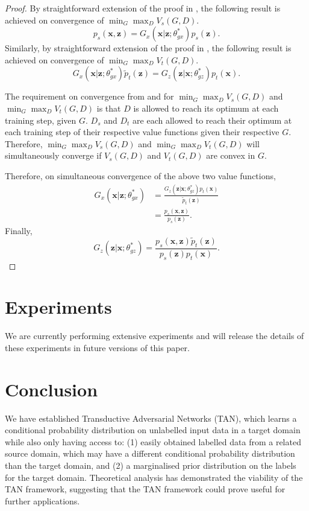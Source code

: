 \documentclass{article}
\begin{document}
\begin{proof}
By straightforward extension of the proof in \cite{goodfellow2014generative}, the following result is achieved on convergence of $\min_{G} \max_{D} V_s(G, D)$. 
\begin{equation}
p_s(\bm{x},\bm{z}) = G_x(\bm{x}|\bm{z};\theta_{gx}^*)p_s(\bm{z}).
\end{equation}
Similarly, by straightforward extension of the proof in \cite{dumoulin2016adversarially}, the following result is achieved on convergence of $\min_{G} \max_{D} V_t(G, D)$.
\begin{equation}
G_x(\bm{x}|\bm{z};\theta_{gx}^*)\widetilde{p}_t(\bm{z}) = G_z(\bm{z}|\bm{x}; \theta_{gz}^*)p_t(\bm{x}).
\end{equation}

The requirement on convergence from \cite{goodfellow2014generative} and \cite{dumoulin2016adversarially} for $\min_{G} \max_{D} V_s(G, D)$ and $\min_{G} \max_{D} V_t(G, D)$ is that $D$ is allowed to reach its optimum at each training step, given $G$. $D_s$ and $D_t$ are each allowed to reach their optimum at each training step of their respective value functions given their respective $G$. Therefore, $\min_{G} \max_{D} V_s(G, D)$ and $\min_{G} \max_{D} V_t(G, D)$ will simultaneously converge if $V_s(G, D)$ and $V_t(G, D)$ are convex in $G$.

Therefore, on simultaneous convergence of the above two value functions,
\begin{equation}
\begin{split}
G_x(\bm{x}|\bm{z};\theta_{gx}^*) &= \frac{G_z(\bm{z}|\bm{x}; \theta_{gz}^*)p_t(\bm{x})}{\widetilde{p}_t(\bm{z})}\\
&= \frac{p_s(\bm{x},\bm{z})}{p_s(\bm{z})}.
\end{split}
\end{equation}
Finally,
\begin{equation}
G_z(\bm{z}|\bm{x}; \theta_{gz}^*) = \frac{p_s(\bm{x},\bm{z})\widetilde{p}_t(\bm{z})}{p_s(\bm{z})p_t(\bm{x})}.
\end{equation}
\end{proof}

\section{Experiments}
We are currently performing extensive experiments and will release the details of these experiments in future versions of this paper.
\section{Conclusion}
We have established Transductive Adversarial Networks (TAN), which learns a conditional probability distribution on unlabelled input data in a target domain while also only having access to: (1) easily obtained labelled data from a related source domain, which may have a different conditional probability distribution than the target domain, and (2) a marginalised prior distribution on the labels for the target domain. Theoretical analysis has demonstrated the viability of the TAN framework, suggesting that the TAN framework could prove useful for further applications.
\end{document}
